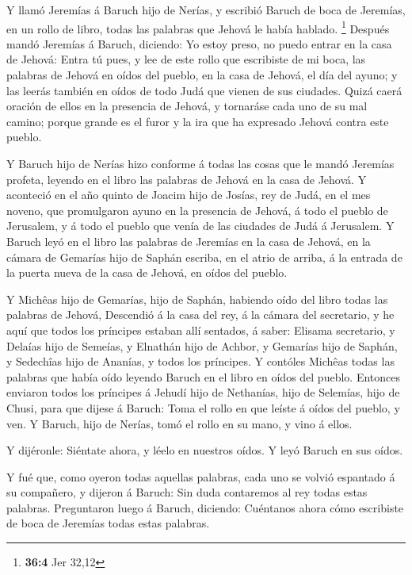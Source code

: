  Y llamó Jeremías á Baruch hijo de Nerías, y escribió
Baruch de boca de Jeremías, en un rollo de libro, todas las palabras que
Jehová le había hablado. \footnote{\textbf{36:4} Jer 32,12}
 Después mandó Jeremías á Baruch, diciendo: Yo estoy
preso, no puedo entrar en la casa de Jehová:  Entra tú
pues, y lee de este rollo que escribiste de mi boca, las palabras de
Jehová en oídos del pueblo, en la casa de Jehová, el día del ayuno; y
las leerás también en oídos de todo Judá que vienen de sus ciudades.
 Quizá caerá oración de ellos en la presencia de Jehová, y
tornaráse cada uno de su mal camino; porque grande es el furor y la ira
que ha expresado Jehová contra este pueblo.

 Y Baruch hijo de Nerías hizo conforme á todas las cosas
que le mandó Jeremías profeta, leyendo en el libro las palabras de
Jehová en la casa de Jehová.  Y aconteció en el año quinto
de Joacim hijo de Josías, rey de Judá, en el mes noveno, que promulgaron
ayuno en la presencia de Jehová, á todo el pueblo de Jerusalem, y á todo
el pueblo que venía de las ciudades de Judá á Jerusalem. 
Y Baruch leyó en el libro las palabras de Jeremías en la casa de Jehová,
en la cámara de Gemarías hijo de Saphán escriba, en el atrio de arriba,
á la entrada de la puerta nueva de la casa de Jehová, en oídos del
pueblo.

 Y Michêas hijo de Gemarías, hijo de Saphán, habiendo
oído del libro todas las palabras de Jehová,  Descendió á
la casa del rey, á la cámara del secretario, y he aquí que todos los
príncipes estaban allí sentados, á saber: Elisama secretario, y Delaías
hijo de Semeías, y Elnathán hijo de Achbor, y Gemarías hijo de Saphán, y
Sedechîas hijo de Ananías, y todos los príncipes.  Y
contóles Michêas todas las palabras que había oído leyendo Baruch en el
libro en oídos del pueblo.  Entonces enviaron todos los
príncipes á Jehudí hijo de Nethanías, hijo de Selemías, hijo de Chusi,
para que dijese á Baruch: Toma el rollo en que leíste á oídos del
pueblo, y ven. Y Baruch, hijo de Nerías, tomó el rollo en su mano, y
vino á ellos.

 Y dijéronle: Siéntate ahora, y léelo en nuestros oídos.
Y leyó Baruch en sus oídos.

 Y fué que, como oyeron todas aquellas palabras, cada uno
se volvió espantado á su compañero, y dijeron á Baruch: Sin duda
contaremos al rey todas estas palabras.  Preguntaron
luego á Baruch, diciendo: Cuéntanos ahora cómo escribiste de boca de
Jeremías todas estas palabras.

